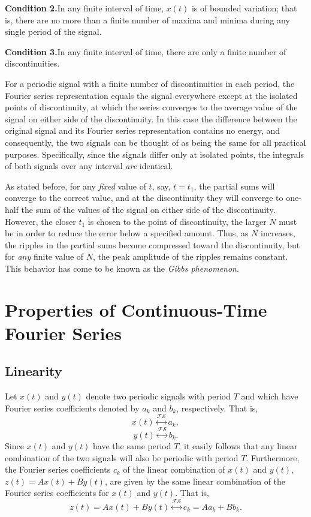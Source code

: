 \documentclass[a4paper,10pt,twoside]{book}
\begin{document}
\noindent\textbf{Condition 2.}\quad In any finite interval of time, $x(t)$ is of bounded variation; that is, there are no more than a finite number of maxima and minima during any single period of the signal.

\noindent\textbf{Condition 3.}\quad In any finite interval of time, there are only a finite number of discontinuities.

For a periodic signal with a finite number of discontinuities in each period, the Fourier series representation equals the signal everywhere except at the isolated points of discontinuity, at which the series converges to the average value of the signal on either side of the discontinuity. In this case the difference between the original signal and its Fourier series representation contains no energy, and consequently, the two signals can be thought of as being the same for all practical purposes. Specifically, since the signals differ only at isolated points, the integrals of both signals over any interval \textit{are} identical.

As stated before, for any \textit{fixed} value of $t$, say, $t=t_1$, the partial sums will converge to the correct value, and at the discontinuity they will converge to one-half the sum of the values of the signal on either side of the discontinuity. However, the closer $t_1$ is chosen to the point of discontinuity, the larger $N$ must be in order to reduce the error below a specified amount. Thus, as $N$ increases, the ripples in the partial sums become compressed toward the discontinuity, but for \textit{any} finite value of $N$, the peak amplitude of the ripples remains constant. This behavior has come to be known as the \textit{Gibbs phenomenon}.

\section{Properties of Continuous-Time Fourier Series}
\subsection{Linearity}

Let $x(t)$ and $y(t)$ denote two periodic signals with period $T$ and which have Fourier series coefficients denoted by $a_k$ and $b_k$, respectively. That is, $$x(t)\overset{\mathcal{FS}}{\longleftrightarrow}a_k,$$$$y(t)\overset{\mathcal{FS}}{\longleftrightarrow}b_k.$$ Since $x(t)$ and $y(t)$ have the same period $T$, it easily follows that any linear combination of the two signals will also be periodic with period $T$. Furthermore, the Fourier series coefficients $c_k$ of the linear combination of $x(t)$ and $y(t)$, $z(t)=Ax(t)+By(t)$, are given by the same linear combination of the Fourier series coefficients for $x(t)$ and $y(t)$. That is,
\begin{equation}
    z(t) = Ax(t)+By(t) \overset{\mathcal{FS}}{\longleftrightarrow} c_{k} = Aa_{k} + Bb_{k}.
    \label{3.58}
\end{equation}
\end{document}

